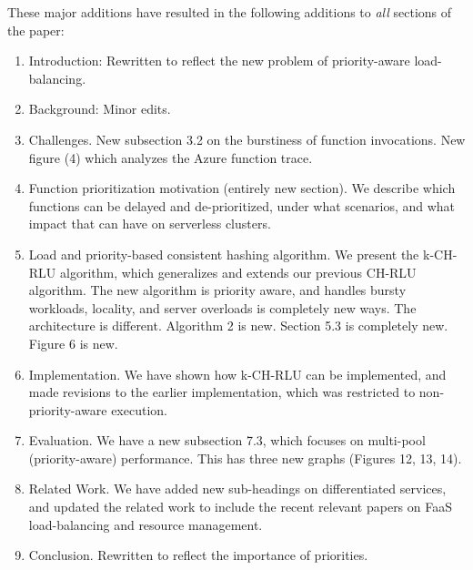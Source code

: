 \documentclass[11pt, letterpaper]{article}
\begin{document}
\hline
\vspace*{10pt}
\noindent These major additions have resulted in the following additions to \emph{all} sections of the paper: 
\begin{enumerate}
\item Introduction: Rewritten to reflect the new problem of priority-aware load-balancing. 
\item Background: Minor edits. 
\item Challenges. New subsection 3.2 on the burstiness of function invocations. New figure (4) which analyzes the Azure function trace. 
\item Function prioritization motivation (entirely new section). We describe which functions can be delayed and de-prioritized, under what scenarios, and what impact that can have on serverless clusters. 
\item Load and priority-based consistent hashing algorithm. We present the k-CH-RLU algorithm, which generalizes and extends our previous CH-RLU algorithm. The new algorithm is priority aware, and handles bursty workloads, locality, and server overloads is completely new ways. The architecture is different. Algorithm 2 is new. Section 5.3 is completely new. Figure 6 is new. 
\item Implementation. We have shown how k-CH-RLU can be implemented, and made revisions to the earlier implementation, which was restricted to non-priority-aware execution. 
\item Evaluation. We have a new subsection 7.3, which focuses on multi-pool (priority-aware) performance. This has three new graphs (Figures 12, 13, 14). 
\item Related Work. We have added new sub-headings on differentiated services, and updated the related work to include the recent relevant papers on FaaS load-balancing and resource management.
\item Conclusion. Rewritten to reflect the importance of priorities. 
\end{enumerate}
\end{document}
